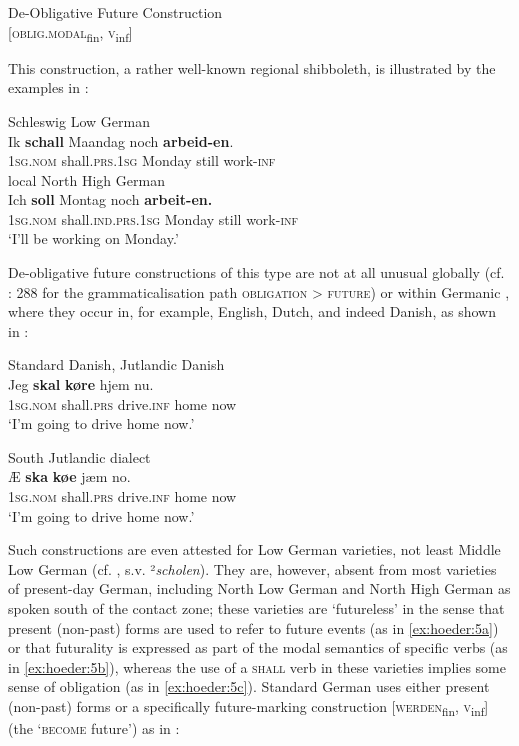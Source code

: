 \documentclass[output=paper]{langsci/langscibook}
\begin{document}
	\ea
	\label{ex:hoeder:2}
	De-Obligative Future Construction\\
    {[}\textsc{oblig.modal}\textsubscript{fin}, \textsc{v}\textsubscript{inf}{]}
    \z
    
This construction, a rather well-known regional shibboleth, is illustrated by the examples in :


 \ea
 	\label{ex:hoeder:3}
	\ea
	\label{ex:hoeder:3a}
	Schleswig Low German\\
	\gll Ik \textbf{schall} Maandag noch \textbf{arbeid-en}.\\
     \textsc{1sg.nom} shall\textsc{.prs.1sg} Monday still work-\textsc{inf}\\
	
	\ex\label{ex:hoeder:3b}
	local North High German\\
	\gll Ich \textbf{soll} Montag noch \textbf{arbeit-en.}\\
     1\textsc{sg.nom} shall.\textsc{ind.prs}.1\textsc{sg}{} Monday still{} work-\textsc{inf}\\
	\glt `I’ll be{} working on Monday.'
\z
\z

De-obligative future constructions of this type are not at all unusual globally (cf. \citealt{Kuteva.2019}: 288 for the grammaticalisation path{} \textsc{obligation} > \textsc{future}) or within Germanic \citep[319--320]{Dahl.2000}, where they occur in, for example, English, Dutch, and indeed Danish, as shown in :

 \ea
\label{ex:hoeder:4}
	\ea
	\label{ex:hoeder:4a}
	Standard Danish, Jutlandic Danish\\
	\gll Jeg \textbf{skal} \textbf{køre}{} hjem nu.\\
     {\textsc{1sg.nom}} shall\textsc{.prs} drive.\textsc{inf} home now\\
	\glt `I’m going to drive home now.'

	\ex\label{ex:hoeder:4b}
		South Jutlandic dialect\\
		\gll Æ \textbf{ska} \textbf{køe}{} jæm no.\\
    	 1\textsc{sg.nom} shall.\textsc{prs} drive.\textsc{inf} home now\\
	\glt `I’m going{} to drive home now.'
\z
\z

Such constructions are even attested for Low German varieties, not least Middle Low German (cf. \citealt{Schiller.18751881}, s.v. ²\textit{scholen}). They are, however, absent from most varieties of present-day German, including North Low German and North High German as spoken south of the contact zone; these varieties are ‘futureless’ in the sense that present (non-past) forms are used to refer to future events (as in \ref{ex:hoeder:5a}) or that futurality is expressed as part of the modal{ semantics of specific verbs (as in \ref{ex:hoeder:5b}), whereas the use of a \textsc{shall}} verb in these varieties implies some sense of obligation (as in \ref{ex:hoeder:5c}). Standard German uses either present (non-past) forms or a specifically future-marking construction {[}\textsc{werden}\textsubscript{fin}, \textsc{v}\textsubscript{inf}{]} (the ‘\textsc{become} future’) as in :
\end{document}
